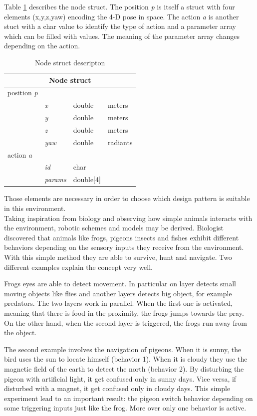 Table \ref{tab:node} describes the node struct. The position \textit{p} is itself a struct with four elements (x,y,z,yaw) encoding the 4-D pose in space. The action \textit{a} is another stuct with a char value to identify the type of action and a parameter array which can be filled with values. The meaning of the parameter array changes depending on the action.
\begin{table}[h]
\centering
\begin{tabular}{llll}
\multicolumn{4}{c}{\textbf{Node} struct} \\
\hline
position \textit{p} &     &       &           \\
           & \textit{x}   & double & meters    \\
           & \textit{y}   & double & meters    \\
           & \textit{z}   & double & meters    \\
           & \textit{yaw} & double & radiants  \\ \hline
action \textit{a}   &     &       &           \\
           & \textit{id}  & char  &           \\
           & \textit{params}    &  double[4]     & \\
\end{tabular}
\label{tab:node}
\caption{Node struct descripton}
\end{table}
Those elements are necessary in order to choose which design pattern is suitable in this environment.
\newline \\
\noindent
Taking inspiration from biology and observing how simple animals interacts with the environment, robotic schemes and models may be derived. Biologist discovered that animals like frogs, pigeons insects and fishes exhibit different behaviors depending on the sensory inputs they receive from the environment. With this simple method they are able to survive, hunt and navigate. Two different examples explain the concept very well.

Frogs eyes are able to detect movement. In particular on layer detects small moving objects like flies and another layers detects big object, for example predators. The two layers work in parallel. When the first one is activated, meaning that there is food in the proximity, the frogs jumps towards the pray. On the other hand, when the second layer is triggered, the frogs run away from the object. 

The second example involves the navigation of pigeons. When it is sunny, the bird uses the sun to locate himself (behavior 1). When it is cloudy they use the magnetic field of the earth to detect the north (behavior 2). By disturbing the pigeon with artificial light, it get confused only in sunny days. Vice versa, if disturbed with a magnet, it get confused only in cloudy days. This simple experiment lead to an important result: the pigeon switch behavior depending on some triggering inputs just like the frog. More over only one behavior is active. 
